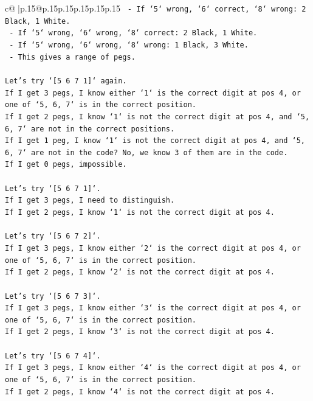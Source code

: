 \documentclass{article}
\begin{document}
{\begin{supertabular}{c@{$\;$}|p{.15\linewidth}@{}p{.15\linewidth}p{.15\linewidth}p{.15\linewidth}p{.15\linewidth}p{.15\linewidth}}
{{{\texttt{    {-} If `5` wrong, `6` correct, `8` wrong: 2 Black, 1 White.} \\
\texttt{    {-} If `5` wrong, `6` wrong, `8` correct: 2 Black, 1 White.} \\
\texttt{    {-} If `5` wrong, `6` wrong, `8` wrong: 1 Black, 3 White.} \\
\texttt{  {-} This gives a range of pegs.} \\
\\ 
\texttt{Let's try `{[}5 6 7 1{]}` again.} \\
\texttt{If I get 3 pegs, I know either `1` is the correct digit at pos 4, or one of `5, 6, 7` is in the correct position.} \\
\texttt{If I get 2 pegs, I know `1` is not the correct digit at pos 4, and `5, 6, 7` are not in the correct positions.} \\
\texttt{If I get 1 peg, I know `1` is not the correct digit at pos 4, and `5, 6, 7` are not in the code? No, we know 3 of them are in the code.} \\
\texttt{If I get 0 pegs, impossible.} \\
\\ 
\texttt{Let's try `{[}5 6 7 1{]}`.} \\
\texttt{If I get 3 pegs, I need to distinguish.} \\
\texttt{If I get 2 pegs, I know `1` is not the correct digit at pos 4.} \\
\\ 
\texttt{Let's try `{[}5 6 7 2{]}`.} \\
\texttt{If I get 3 pegs, I know either `2` is the correct digit at pos 4, or one of `5, 6, 7` is in the correct position.} \\
\texttt{If I get 2 pegs, I know `2` is not the correct digit at pos 4.} \\
\\ 
\texttt{Let's try `{[}5 6 7 3{]}`.} \\
\texttt{If I get 3 pegs, I know either `3` is the correct digit at pos 4, or one of `5, 6, 7` is in the correct position.} \\
\texttt{If I get 2 pegs, I know `3` is not the correct digit at pos 4.} \\
\\ 
\texttt{Let's try `{[}5 6 7 4{]}`.} \\
\texttt{If I get 3 pegs, I know either `4` is the correct digit at pos 4, or one of `5, 6, 7` is in the correct position.} \\
\texttt{If I get 2 pegs, I know `4` is not the correct digit at pos 4.} \\
}}}
\end{supertabular}}
\end{document}
